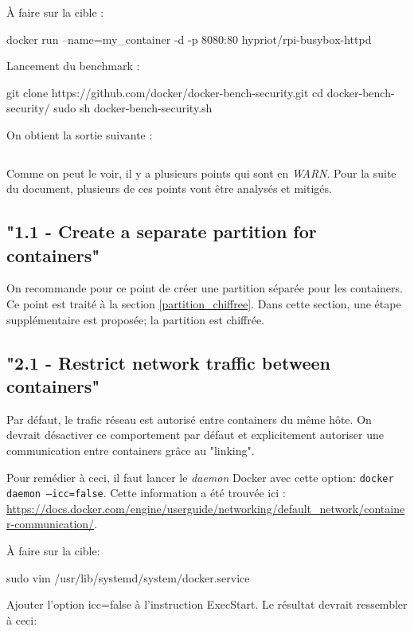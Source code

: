 \documentclass[11pt,a4paper,oneside]{report}
\newcommand{\code}[1]{\texttt{#1}}
\begin{document}
À faire sur la cible :
\begin{bashcode}
docker run --name=my_container -d -p 8080:80 hypriot/rpi-busybox-httpd
\end{bashcode}

Lancement du benchmark :
\begin{bashcode}
git clone https://github.com/docker/docker-bench-security.git
cd docker-bench-security/
sudo sh docker-bench-security.sh
\end{bashcode}

On obtient la sortie suivante :

\inputminted[xleftmargin=20pt, linenos=true, breaklines=true, frame=single, framesep=6pt, tabsize=2, fontfamily=courier, fontsize=\small]{text}{../../docker_security_benchmark/vanilla.log}


Comme on peut le voir, il y a plusieurs points qui sont en \textit{WARN}. Pour la suite du document, plusieurs de ces points vont être analysés et mitigés.


\subsection{"1.1  - Create a separate partition for containers"}
On recommande pour ce point de créer une partition séparée pour les containers. Ce point est traité à la section \ref{partition_chiffree}. Dans cette section, une étape supplémentaire est proposée; la partition est chiffrée.


\subsection{"2.1  - Restrict network traffic between containers"}
Par défaut, le trafic réseau est autorisé entre containers du même hôte. On devrait désactiver ce comportement par défaut et explicitement autoriser une communication entre containers grâce au "linking".

Pour remédier à ceci, il faut lancer le \textit{daemon} Docker avec cette option: \code{docker daemon --icc=false}. Cette information a été trouvée ici : \url{https://docs.docker.com/engine/userguide/networking/default_network/container-communication/}.

À faire sur la cible:

\begin{bashcode}
sudo vim /usr/lib/systemd/system/docker.service
\end{bashcode}

Ajouter l'option icc=false à l'instruction ExecStart. Le résultat devrait ressembler à ceci:
\end{document}
